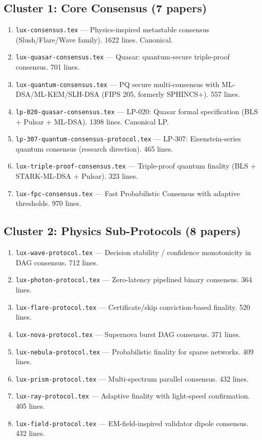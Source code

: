 \documentclass[11pt,a4paper]{article}
\begin{document}
\subsection{Cluster 1: Core Consensus (7 papers)}
\begin{enumerate}[leftmargin=2em]
\item \texttt{lux-consensus.tex} --- Physics-inspired metastable consensus (Slush/Flare/Wave family). 1622 lines. Canonical.
\item \texttt{lux-quasar-consensus.tex} --- Quasar: quantum-secure triple-proof consensus. 701 lines.
\item \texttt{lux-quantum-consensus.tex} --- PQ secure multi-consensus with ML-DSA/ML-KEM/SLH-DSA (FIPS 205, formerly SPHINCS+). 557 lines.
\item \texttt{lp-020-quasar-consensus.tex} --- LP-020: Quasar formal specification (BLS + Pulsar + ML-DSA). 1398 lines. Canonical LP.
\item \texttt{lp-307-quantum-consensus-protocol.tex} --- LP-307: Eisenstein-series quantum consensus (research direction). 465 lines.
\item \texttt{lux-triple-proof-consensus.tex} --- Triple-proof quantum finality (BLS + STARK-ML-DSA + Pulsar). 323 lines.
\item \texttt{lux-fpc-consensus.tex} --- Fast Probabilistic Consensus with adaptive thresholds. 970 lines.
\end{enumerate}

\subsection{Cluster 2: Physics Sub-Protocols (8 papers)}
\begin{enumerate}[leftmargin=2em]
\item \texttt{lux-wave-protocol.tex} --- Decision stability / confidence monotonicity in DAG consensus. 712 lines.
\item \texttt{lux-photon-protocol.tex} --- Zero-latency pipelined binary consensus. 364 lines.
\item \texttt{lux-flare-protocol.tex} --- Certificate/skip conviction-based finality. 520 lines.
\item \texttt{lux-nova-protocol.tex} --- Supernova burst DAG consensus. 371 lines.
\item \texttt{lux-nebula-protocol.tex} --- Probabilistic finality for sparse networks. 409 lines.
\item \texttt{lux-prism-protocol.tex} --- Multi-spectrum parallel consensus. 432 lines.
\item \texttt{lux-ray-protocol.tex} --- Adaptive finality with light-speed confirmation. 405 lines.
\item \texttt{lux-field-protocol.tex} --- EM-field-inspired validator dipole consensus. 432 lines.
\end{enumerate}
\end{document}

